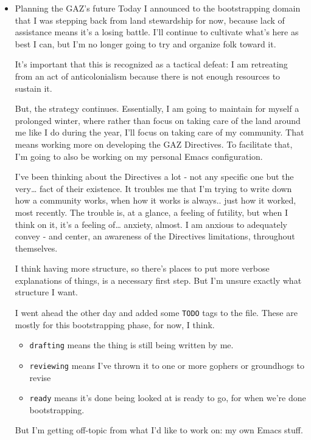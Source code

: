 \documentclass[11pt]{article}
\begin{document}
\begin{itemize}
\item Planning the GAZ's future
\label{sec:org5db6fa7}
Today I announced to the bootstrapping domain that I was stepping back from land stewardship for now, because lack of assistance means it's a losing battle. I'll continue to cultivate what's here as best I can, but I'm no longer going to try and organize folk toward it.

It's important that this is recognized as a tactical defeat: I am retreating from an act of anticolonialism because there is not enough resources to sustain it.

But, the strategy continues. Essentially, I am going to maintain for myself a prolonged winter, where rather than focus on taking care of the land around me like I do during the year, I'll focus on taking care of my community. That means working more on developing the GAZ Directives. To facilitate that, I'm going to also be working on my personal Emacs configuration.

I've been thinking about the Directives a lot - not any specific one but the very\ldots{} fact of their existence. It troubles me that I'm trying to write down how a community works, when how it works is always.. just how it worked, most recently. The trouble is, at a glance, a feeling of futility, but when I think on it, it's a feeling of\ldots{} anxiety, almost. I am anxious to adequately convey - and center, an awareness of the Directives limitations, throughout themselves.

I think having more structure, so there's places to put more verbose explanations of things, is a necessary first step. But I'm unsure exactly what structure I want.

I went ahead the other day and added some \texttt{TODO} tags to the file. These are mostly for this bootstrapping phase, for now, I think.

\begin{itemize}
\item \texttt{drafting} means the thing is still being written by me.
\item \texttt{reviewing} means I've thrown it to one or more gophers or groundhogs to revise
\item \texttt{ready} means it's done being looked at is ready to go, for when we're done bootstrapping.
\end{itemize}

But I'm getting off-topic from what I'd like to work on: my own Emacs stuff.
\end{itemize}
\end{document}
